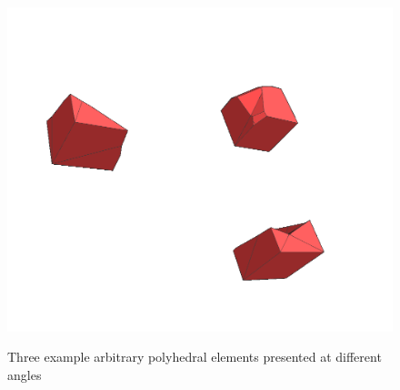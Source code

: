 \begin{figure}[htbp!]
{		\includegraphics[scale=0.125]{media/3-celeris/zoom/zoom5.png}
\label{fig:zoom5}}		
\hfill
{}	
\caption{Three example arbitrary polyhedral elements presented at different angles}
\label{fig:zoom}
\end{figure}

